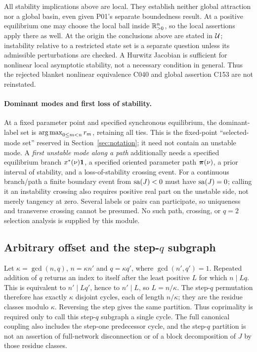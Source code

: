 All stability implications above are local. They establish neither
global attraction nor a global basin, even given P01's separate
boundedness result. At a positive equilibrium one may choose the
local ball inside $\mathbb{R}_{>0}^{n}$, so the local assertions apply there
as well. At the origin the conclusions above are stated in
$\mathcal{U}$; instability relative to a restricted state set is a
separate question unless its admissible perturbations are checked.
A Hurwitz Jacobian is sufficient for nonlinear local asymptotic
stability, not a necessary condition in general. Thus the rejected
blanket nonlinear equivalence C040 and global assertion C153 are
not reinstated.

\paragraph{Dominant modes and first loss of stability.}
At a fixed parameter point and specified synchronous equilibrium,
the dominant-label set is $\operatorname*{arg\,max}_{0\le m<n}r_m$, retaining all
ties. This is the fixed-point ``selected-mode set'' reserved in
Section~\ref{sec:notation}; it need not contain an unstable mode.
A \emph{first unstable mode along a path} additionally needs a
specified equilibrium branch $x^*(\nu)\mathbf{1}$, a specified oriented
parameter path $\boldsymbol{\pi}(\nu)$, a prior interval of stability, and a
loss-of-stability crossing event. For a continuous branch/path a
finite boundary event from $\operatorname{sa}(J)<0$ must have $\operatorname{sa}(J)=0$;
calling it an instability crossing also requires positive real part
on the unstable side, not merely tangency at zero. Several labels
or pairs can participate, so uniqueness and transverse crossing
cannot be presumed. No such path, crossing, or $q=2$ selection
analysis is supplied by this module.

\subsection{Arbitrary offset and the step-\texorpdfstring{$q$}{q} subgraph}
\label{prop:P04-step-cycles}
Let $\kappa=\gcd(n,q)$, $n=\kappa n'$ and $q=\kappa q'$,
where $\gcd(n',q')=1$. Repeated addition of $q$ returns an index
to itself after the least positive $L$ for which $n\mid Lq$.
This is equivalent to $n'\mid Lq'$, hence to $n'\mid L$,
so $L=n/\kappa$. The step-$q$ permutation therefore has exactly
$\kappa$ disjoint cycles, each of length $n/\kappa$; they are the
residue classes modulo $\kappa$. Reversing the step gives the same
partition. Thus coprimality is required only to call this step-$q$
subgraph a single cycle. The full canonical coupling also includes
the step-one predecessor cycle, and the step-$q$ partition is not
an assertion of full-network disconnection or of a block decomposition
of $J$ by those residue classes.

